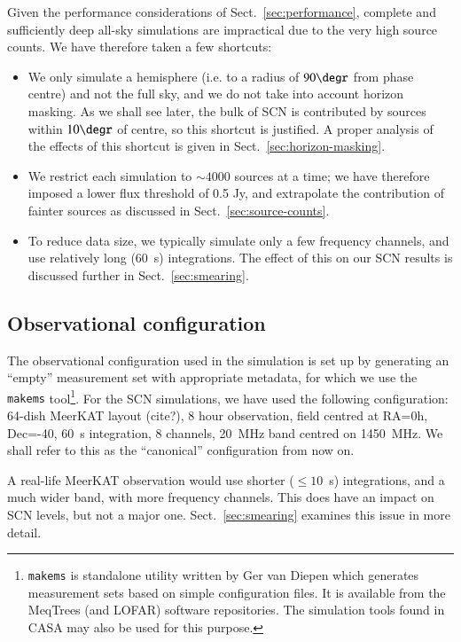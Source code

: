 \documentclass{aa}
\begin{document}
Given the performance considerations of Sect.~\ref{sec:performance}, complete and sufficiently deep all-sky simulations are impractical due to the very high source counts. We have therefore taken a few shortcuts:

\begin{itemize}
  \item We only simulate a hemisphere (i.e. to a radius of $90\degr$ from phase centre) and not the full sky, and we do not take into account horizon masking. As we shall see later, the bulk of SCN is contributed by sources within $10\degr$ of centre, so this shortcut is justified. A proper analysis of the effects of this shortcut is given in Sect.~\ref{sec:horizon-masking}.
  \item We restrict each simulation to $\sim4000$ sources at a time; we have therefore imposed a lower flux threshold of 0.5 Jy, and extrapolate the contribution of fainter sources as discussed in Sect.~\ref{sec:source-counts}.
  \item To reduce data size, we typically simulate only a few frequency channels, and use relatively long (60~s) integrations. The effect of this on our SCN results is discussed further in Sect.~\ref{sec:smearing}.
\end{itemize}

\subsection{Observational configuration}
\label{sec:config}

The observational configuration used in the simulation is set up by generating an ``empty'' measurement set with appropriate metadata, for which we use the {\tt makems} tool\footnote{{\tt makems} is standalone utility written by Ger van Diepen which generates measurement sets based on simple configuration files. It is available from the MeqTrees (and LOFAR) software repositories. The simulation tools found in CASA may also be used for this purpose.}. For the SCN simulations, we have used the following configuration: 64-dish MeerKAT layout (cite?), 8 hour observation, field centred at RA=0h, Dec=-40\degr, 60~s integration, 8 channels, 20~MHz band centred on 1450~MHz. We shall refer to this as the ``canonical'' configuration from now on.

A real-life MeerKAT observation would use shorter ($\leq10$~s) integrations, and a much wider band, with more frequency channels. This does have an impact on SCN levels, but not a major one. Sect.~\ref{sec:smearing} examines this issue in more detail.
\end{document}
